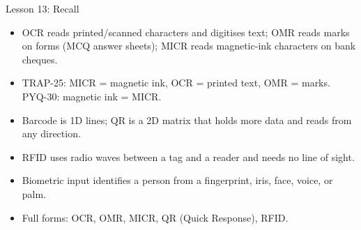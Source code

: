 \documentclass[aspectratio=169]{beamer}
\begin{document}
\begin{frame}{Lesson 13: Recall}
  \begin{itemize}
    \item OCR reads printed/scanned characters and digitises text; OMR reads
      marks on forms (MCQ answer sheets); MICR reads magnetic-ink characters
      on bank cheques.
    \item TRAP-25: MICR = magnetic ink, OCR = printed text, OMR = marks.
      PYQ-30: magnetic ink = MICR.
    \item Barcode is 1D lines; QR is a 2D matrix that holds more data and
      reads from any direction.
    \item RFID uses radio waves between a tag and a reader and needs no line
      of sight.
    \item Biometric input identifies a person from a fingerprint, iris, face,
      voice, or palm.
    \item Full forms: OCR, OMR, MICR, QR (Quick Response), RFID.
  \end{itemize}
\end{frame}
\end{document}
